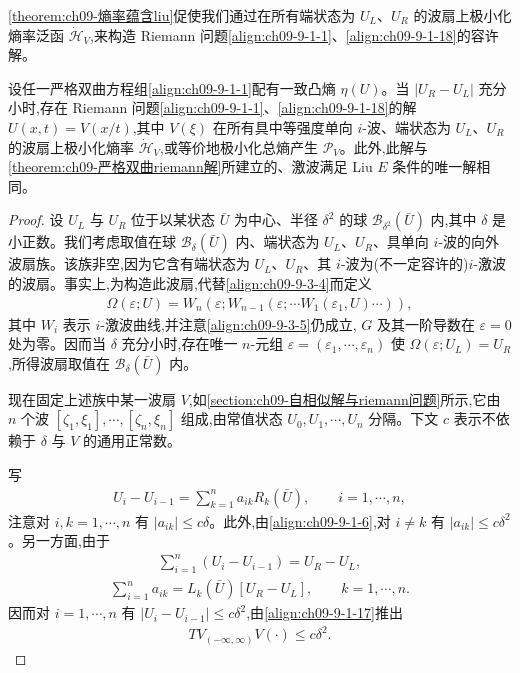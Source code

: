 \documentclass[../../main.tex]{subfiles}
\begin{document}
\cref{theorem:ch09-熵率蕴含liu}促使我们通过在所有端状态为 $U_{L}$、$U_{R}$ 的波扇上极小化熵率泛函 $\dot{\mathscr{H}}_{V}$,来构造 Riemann 问题\eqref{align:ch09-9-1-1}、\eqref{align:ch09-9-1-18}的容许解。

\begin{theorem}\label{theorem:ch09-熵率极小化}
设任一严格双曲方程组\eqref{align:ch09-9-1-1}配有一致凸熵 $\eta(U)$。当 $|U_{R}-U_{L}|$ 充分小时,存在 Riemann 问题\eqref{align:ch09-9-1-1}、\eqref{align:ch09-9-1-18}的解 $U(x,t)=V(x/t)$,其中 $V(\xi)$ 在所有具中等强度单向 $i$-波、端状态为 $U_{L}$、$U_{R}$ 的波扇上极小化熵率 $\dot{\mathscr{H}}_{V}$,或等价地极小化总熵产生 $\mathscr{P}_{V}$。此外,此解与\cref{theorem:ch09-严格双曲riemann解}所建立的、激波满足 Liu $E$ 条件的唯一解相同。
\end{theorem}

\begin{proof}
设 $U_{L}$ 与 $U_{R}$ 位于以某状态 $\bar{U}$ 为中心、半径 $\delta^{2}$ 的球 $\mathscr{B}_{\delta^{2}}(\bar{U})$ 内,其中 $\delta$ 是小正数。我们考虑取值在球 $\mathscr{B}_{\delta}(\bar{U})$ 内、端状态为 $U_{L}$、$U_{R}$、具单向 $i$-波的向外波扇族。该族非空,因为它含有端状态为 $U_{L}$、$U_{R}$、其 $i$-波为(不一定容许的)$i$-激波的波扇。事实上,为构造此波扇,代替\eqref{align:ch09-9-3-4}而定义
\begin{align}
\Omega(\varepsilon;U)=W_{n}(\varepsilon;W_{n-1}(\varepsilon;\cdots W_{1}(\varepsilon_{1},U)\cdots)),
\label{align:ch09-9-7-31}
\end{align}
其中 $W_{i}$ 表示 $i$-激波曲线,并注意\eqref{align:ch09-9-3-5}仍成立, $G$ 及其一阶导数在 $\varepsilon=0$ 处为零。因而当 $\delta$ 充分小时,存在唯一 $n$-元组 $\varepsilon=(\varepsilon_{1},\cdots ,\varepsilon_{n})$ 使 $\Omega(\varepsilon;U_{L})=U_{R}$,所得波扇取值在 $\mathscr{B}_{\delta}(\bar{U})$ 内。

现在固定上述族中某一波扇 $V$,如\cref{section:ch09-自相似解与riemann问题}所示,它由 $n$ 个波 $[\zeta_{1},\xi_{1}],\cdots ,[\zeta_{n},\xi_{n}]$ 组成,由常值状态 $U_{0},U_{1},\cdots ,U_{n}$ 分隔。下文 $c$ 表示不依赖于 $\delta$ 与 $V$ 的通用正常数。

写
\begin{align}
U_{i}-U_{i-1}=\sum_{k=1}^{n}a_{ik}R_{k}(\bar{U}),\qquad i=1,\cdots ,n,
\label{align:ch09-9-7-32}
\end{align}
注意对 $i,k=1,\cdots ,n$ 有 $|a_{ik}|\leqslant c\delta$。此外,由\eqref{align:ch09-9-1-6},对 $i\neq k$ 有 $|a_{ik}|\leqslant c\delta^{2}$。另一方面,由于
\begin{align}
\sum_{i=1}^{n}(U_{i}-U_{i-1})=U_{R}-U_{L},
\label{align:ch09-9-7-33}
\end{align}
\begin{align}
\sum_{i=1}^{n}a_{ik}=L_{k}(\bar{U})[U_{R}-U_{L}],\qquad k=1,\cdots ,n.
\label{align:ch09-9-7-34}
\end{align}
因而对 $i=1,\cdots ,n$ 有 $|U_{i}-U_{i-1}|\leqslant c\delta^{2}$,由\eqref{align:ch09-9-1-17}推出
\begin{align}
TV_{(-\infty,\infty)}V(\cdot)\leqslant c\delta^{2}.
\label{align:ch09-9-7-35}
\end{align}


\end{proof}
\end{document}
